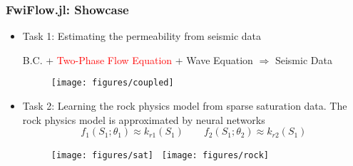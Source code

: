 \documentclass[usenames,dvipsnames]{beamer}
\begin{document}
\begin{frame}
	\frametitle{FwiFlow.jl: Showcase}
	\begin{itemize}
		\item Task 1: Estimating the permeability from seismic data 
		\begin{center}
	B.C. +	\textcolor{red}{Two-Phase Flow Equation} + Wave Equation $\Rightarrow$ Seismic Data
	\end{center}
		\begin{figure}[hbt]
		\centering
  \texttt{[image: figures/coupled]}
\end{figure}
\item Task 2: Learning the rock physics model from sparse saturation data. The rock physics model is approximated by neural networks  
{\scriptsize$$f_1(S_1; \theta_1) \approx k_{r1}(S_1)\qquad f_2(S_1; \theta_2) \approx k_{r2}(S_1)$$}
\vspace{-0.4cm}
\begin{figure}
	\centering
	\texttt{[image: figures/sat]}~
  \texttt{[image: figures/rock]}
\end{figure}
	\end{itemize}
\end{frame}
\end{document}
